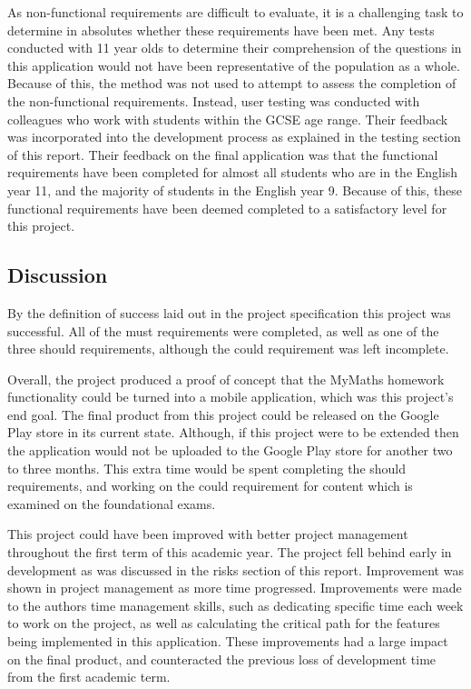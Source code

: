 \documentclass{article}
\begin{document}
As non-functional requirements are difficult to evaluate, it is a challenging task to determine in absolutes whether these requirements have been met. Any tests conducted with 11 year olds to determine their comprehension of the questions in this application would not have been representative of the population as a whole. Because of this, the method was not used to attempt to assess the completion of the non-functional requirements. Instead, user testing was conducted with colleagues who work with students within the GCSE age range. Their feedback was incorporated into the development process as explained in the testing section of this report. Their feedback on the final application was that the functional requirements have been completed for almost all students who are in the English year 11, and the majority of students in the English year 9. Because of this, these functional requirements have been deemed completed to a satisfactory level for this project. \par

\subsection{Discussion}

By the definition of success laid out in the project specification this project was successful. All of the must requirements were completed, as well as one of the three should requirements, although the could requirement was left incomplete. \par

Overall, the project produced a proof of concept that the MyMaths homework functionality could be turned into a mobile application, which was this project's end goal. The final product from this project could be released on the Google Play store in its current state. Although, if this project were to be extended then the application would not be uploaded to the Google Play store for another two to three months. This extra time would be spent completing the should requirements, and working on the could requirement for content which is examined on the foundational exams. \par

This project could have been improved with better project management throughout the first term of this academic year. The project fell behind early in development as was discussed in the risks section of this report. Improvement was shown in project management as more time progressed. Improvements were made to the authors time management skills, such as dedicating specific time each week to work on the project, as well as calculating the critical path for the features being implemented in this application. These improvements had a large impact on the final product, and counteracted the previous loss of development time from the first academic term. \par
\end{document}
